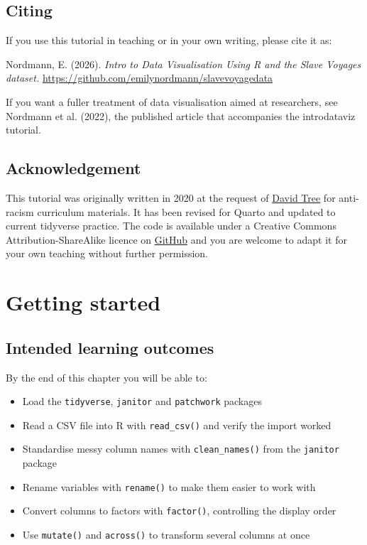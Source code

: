 \documentclass[
  english,
  letterpaper,
]{book}
\providecommand{\tightlist}{%
  \setlength{\itemsep}{0pt}\setlength{\parskip}{0pt}}
\begin{document}
\section*{Citing}\label{citing}


If you use this tutorial in teaching or in your own writing, please cite
it as:

Nordmann, E. (2026). \emph{Intro to Data Visualisation Using R and the
Slave Voyages dataset.}
\url{https://github.com/emilynordmann/slavevoyagedata}

If you want a fuller treatment of data visualisation aimed at
researchers, see Nordmann et al. (2022), the published article that
accompanies the introdataviz tutorial.

\section*{Acknowledgement}\label{acknowledgement}


This tutorial was originally written in 2020 at the request of
\href{https://twitter.com/DavidTree}{David Tree} for anti-racism
curriculum materials. It has been revised for Quarto and updated to
current tidyverse practice. The code is available under a Creative
Commons Attribution-ShareAlike licence on
\href{https://github.com/emilynordmann/slavevoyagedata}{GitHub} and you
are welcome to adapt it for your own teaching without further
permission.


\chapter{Getting started}\label{sec-getting-started}

\section{Intended learning outcomes}\label{intended-learning-outcomes-1}

By the end of this chapter you will be able to:

\begin{itemize}
\tightlist
\item
  Load the \texttt{tidyverse}, \texttt{janitor} and \texttt{patchwork}
  packages
\item
  Read a CSV file into R with \texttt{read\_csv()} and verify the import
  worked
\item
  Standardise messy column names with \texttt{clean\_names()} from the
  \texttt{janitor} package
\item
  Rename variables with \texttt{rename()} to make them easier to work
  with
\item
  Convert columns to factors with \texttt{factor()}, controlling the
  display order
\item
  Use \texttt{mutate()} and \texttt{across()} to transform several
  columns at once
\end{itemize}
\end{document}
